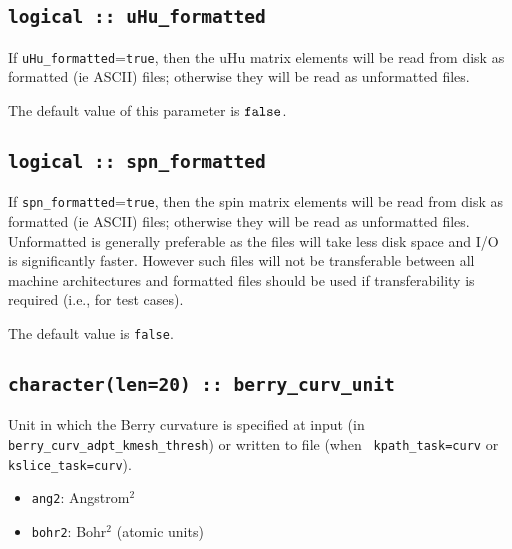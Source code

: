 \subsection[uHu\_formatted]{\tt logical :: uHu\_formatted}

If \verb#uHu_formatted#=\verb#true#, then the uHu matrix elements will be
read from disk as formatted (ie ASCII) files; otherwise they will be
read as unformatted files.

The default value of this parameter is $\verb#false#$.




\subsection[spn\_formatted]{\tt logical :: spn\_formatted}

If \verb#spn_formatted#=\verb#true#, then the spin matrix elements
will be read from disk as formatted (ie ASCII) files; otherwise they
will be read as unformatted files. Unformatted is generally preferable
as the files will take less disk space and I/O is significantly
faster. However such files will not be transferable between all
machine architectures and formatted files should be used if
transferability is required (i.e., for test cases).

The default value is \verb#false#.


\subsection[spn\_formatted]{\tt character(len=20) :: berry\_curv\_unit}

Unit in which the Berry curvature is specified at input (in {\tt
  berry\_curv\_adpt\_kmesh\_thresh}) or written to file (when {\tt
  kpath\_task=curv} or {\tt kslice\_task=curv}).

\begin{itemize}

\item
  {\tt ang2}: Angstrom$^2$

\item
  {\tt bohr2}: Bohr$^2$ (atomic units)

\end{itemize}


